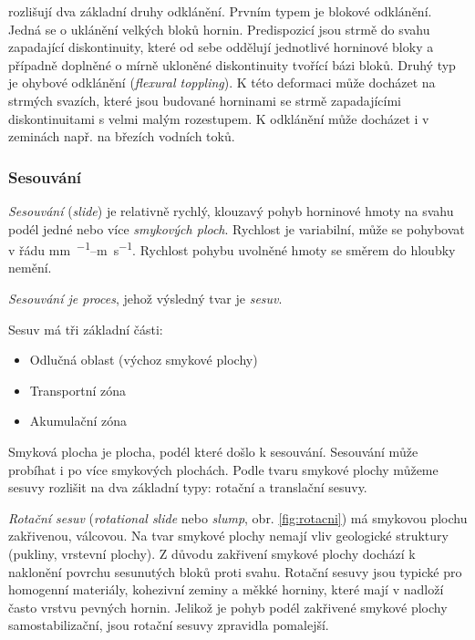 \textcite{goodmanTopplingRockSlopes1976} rozlišují dva základní druhy odklánění. Prvním typem je blokové odklánění. Jedná se o uklánění velkých bloků hornin. Predispozicí jsou strmě do svahu zapadající diskontinuity, které od sebe oddělují jednotlivé horninové bloky a případně doplněné o mírně ukloněné diskontinuity tvořící bázi bloků. Druhý typ je ohybové odklánění (\textit{flexural toppling}). K této deformaci může docházet na strmých svazích, které jsou budované horninami se strmě zapadajícími diskontinuitami s velmi malým rozestupem. K odklánění může docházet i v zeminách např. na březích vodních toků.

\subsubsection{Sesouvání}
\emph{Sesouvání} (\textit{slide}) je relativně rychlý, klouzavý pohyb horninové hmoty na svahu podél jedné nebo více \emph{smykových ploch}. Rychlost je variabilní, může se pohybovat v řádu \si{\milli\metre\per\rok}--\si{\metre\per\second}. Rychlost pohybu uvolněné hmoty se směrem do hloubky nemění.

\emph{Sesouvání je proces}, jehož výsledný tvar je \emph{sesuv}.

Sesuv má tři základní části: 
\begin{itemize}
	\item Odlučná oblast (výchoz smykové plochy)
	\item Transportní zóna
	\item Akumulační zóna
\end{itemize}

Smyková plocha je plocha, podél které došlo k sesouvání. Sesouvání může probíhat i po více smykových plochách. Podle tvaru smykové plochy můžeme sesuvy rozlišit na dva základní typy: rotační a translační sesuvy.

\emph{Rotační sesuv} (\textit{rotational slide} nebo \textit{slump}, obr. \ref{fig:rotacni}) má smykovou plochu zakřivenou, válcovou. Na tvar smykové plochy nemají vliv geologické struktury (pukliny, vrstevní plochy). Z důvodu zakřivení smykové plochy dochází k naklonění povrchu sesunutých bloků proti svahu. Rotační sesuvy jsou typické pro homogenní materiály, kohezivní zeminy a měkké horniny, které mají v nadloží často vrstvu pevných hornin. Jelikož je pohyb podél zakřivené smykové plochy samostabilizační, jsou rotační sesuvy zpravidla pomalejší.

